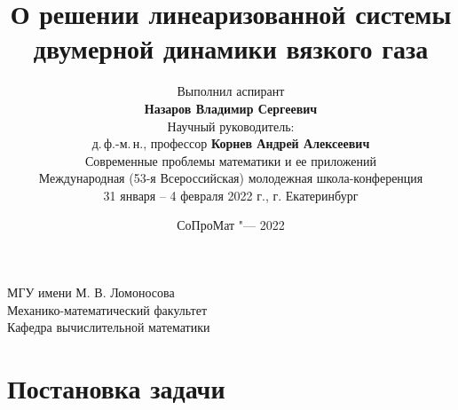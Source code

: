 \documentclass{beamer}
\theoremstyle{plain}
\begin{document}
\title{{О  решении линеаризованной системы двумерной динамики вязкого газа}}
\author[%
	Назаров В.\ С.
]{%
\begin{center}
	Выполнил аспирант \\
	{\bfseries Назаров Владимир Сергеевич }
	\\ \vspace*{0.5cm}
	{\scriptsize
	Научный руководитель: \\
    д.\,ф.-м.\,н., 
	профессор {\bfseries Корнев Андрей Алексеевич}}
	\\ \vspace*{0.4cm}
	{\scriptsize 
	Современные проблемы математики и ее приложений}
	\\ \vspace*{0.2cm}
{\tiny Международная (53-я Всероссийская) молодежная школа-конференция \\ 31 января -- 4 февраля 2022 г., г. Екатеринбург}
	\end{center}
}
\date{
\scriptsize{СоПроМат "--- 2022}
}


	\begin{frame}
		\begin{center}
			\footnotesize{МГУ имени М. В. Ломоносова}\\
			\footnotesize{Механико-математический факультет} \\
			\footnotesize{Кафедра вычислительной математики}\\\vspace{8pt}
		\end{center}
		\titlepage
	\end{frame}


	
	\section{Постановка задачи}
\end{document}
